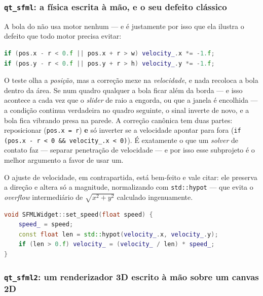 \subsubsection{\texttt{qt\_sfml}: a física escrita à mão, e o seu defeito clássico}

A bola do  não usa motor nenhum --- e é justamente por isso
que ela ilustra o defeito que todo motor precisa evitar:

\begin{lstlisting}[style=bt, language=C++,
    caption={Rebatimento por inversão de sinal --- \texttt{SFMLWidget::tick}.}]
if (pos.x - r < 0.f || pos.x + r > w) velocity_.x *= -1.f;
if (pos.y - r < 0.f || pos.y + r > h) velocity_.y *= -1.f;
\end{lstlisting}

\begin{armadilha}
O teste olha a \emph{posição}, mas a correção mexe na \emph{velocidade}, e nada
recoloca a bola dentro da área. Se num quadro qualquer a bola ficar além da
borda --- e isso acontece a cada vez que o \emph{slider} de raio a engorda, ou
que a janela é encolhida --- a condição continua verdadeira no quadro seguinte,
o sinal inverte de novo, e a bola fica vibrando presa na parede. A correção
canônica tem duas partes: reposicionar (\texttt{pos.x = r}) \textbf{e} só
inverter se a velocidade apontar para fora
(\texttt{if (pos.x - r < 0 \&\& velocity\_.x < 0)}). É exatamente o que um
\emph{solver} de contato faz --- separar penetração de velocidade --- e por isso
esse subprojeto é o melhor argumento a favor de usar um.
\end{armadilha}

O ajuste de velocidade, em contrapartida, está bem-feito e vale citar: ele
preserva a direção e altera só a magnitude, normalizando com \texttt{std::hypot}
--- que evita o \emph{overflow} intermediário de
$\sqrt{x^2 + y^2}$ calculado ingenuamente.

\begin{lstlisting}[style=bt, language=C++,
    caption={Mudar o módulo sem mudar a direção.}]
void SFMLWidget::set_speed(float speed) {
    speed_ = speed;
    const float len = std::hypot(velocity_.x, velocity_.y);
    if (len > 0.f) velocity_ = (velocity_ / len) * speed_;
}
\end{lstlisting}

\subsubsection{\texttt{qt\_sfml2}: um renderizador 3D escrito à mão sobre um canvas 2D}
\label{sec:qt-sfml2}

